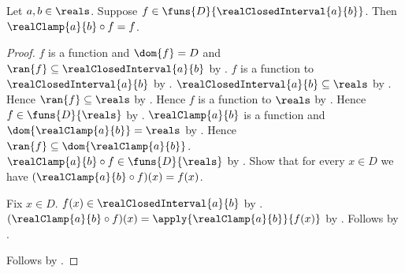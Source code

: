 \begin{proposition}\label{real_clamp_circ_fixes_interval_map}
    Let $a,b\in\reals$.
    Suppose $f\in\funs{D}{\realClosedInterval{a}{b}}$.
    Then $\realClamp{a}{b}\circ f=f$.
\end{proposition}
\begin{proof}
    $f$ is a function and $\dom{f}=D$ and
        $\ran{f}\subseteq\realClosedInterval{a}{b}$
        by .
    $f$ is a function to $\realClosedInterval{a}{b}$
        by .
    $\realClosedInterval{a}{b}\subseteq\reals$
        by .
    Hence $\ran{f}\subseteq\reals$ by .
    Hence $f$ is a function to $\reals$
        by .
    Hence $f\in\funs{D}{\reals}$ by .
    $\realClamp{a}{b}$ is a function and
        $\dom{\realClamp{a}{b}}=\reals$
        by .
    Hence $\ran{f}\subseteq\dom{\realClamp{a}{b}}$.
    $\realClamp{a}{b}\circ f\in\funs{D}{\reals}$
        by .
    Show that for every $x\in D$ we have
        $(\realClamp{a}{b}\circ f)(x)=f(x)$.
    \begin{subproof}
        Fix $x\in D$.
        $f(x)\in\realClosedInterval{a}{b}$
            by .
        $(\realClamp{a}{b}\circ f)(x)
            =\apply{\realClamp{a}{b}}{f(x)}$
            by .
        Follows by .
    \end{subproof}
    Follows by .
\end{proof}

